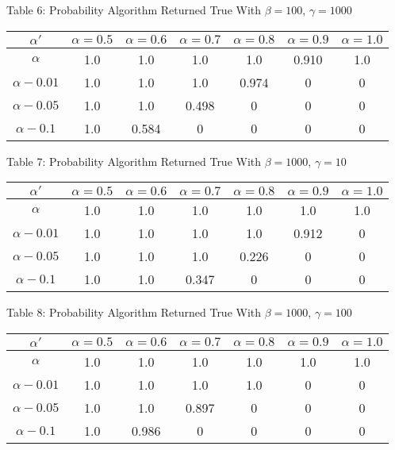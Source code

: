\documentclass{article}
\begin{document}
\begin{center}
Table 6: Probability Algorithm Returned True With $\beta=100$, $\gamma=1000$ \\
\begin{tabular}{|c|c|c|c|c|c|c|}
\hline
$\alpha'$ & $\alpha = 0.5$ & $\alpha = 0.6$ & $\alpha = 0.7$ & $\alpha = 0.8$ & $\alpha = 0.9$ & $\alpha = 1.0$ \\
\hline
$\alpha$ & 1.0 & 1.0 & 1.0 & 1.0 & 0.910 & 1.0 \\
\hline
$\alpha-0.01$ & 1.0 & 1.0 & 1.0 & 0.974 & 0 & 0 \\
\hline
$\alpha-0.05$ & 1.0 & 1.0 & 0.498 & 0 & 0 & 0 \\
\hline
$\alpha-0.1$ & 1.0 & 0.584 & 0 & 0 & 0 & 0 \\
\hline
\end{tabular}
\end{center}

\begin{center}
Table 7: Probability Algorithm Returned True With $\beta=1000$, $\gamma=10$ \\
\begin{tabular}{|c|c|c|c|c|c|c|}
\hline
$\alpha'$ & $\alpha = 0.5$ & $\alpha = 0.6$ & $\alpha = 0.7$ & $\alpha = 0.8$ & $\alpha = 0.9$ & $\alpha = 1.0$ \\
\hline
$\alpha$ & 1.0 & 1.0 & 1.0 & 1.0 & 1.0 & 1.0 \\
\hline
$\alpha-0.01$ & 1.0 & 1.0 & 1.0 & 1.0 & 0.912 & 0 \\
\hline
$\alpha-0.05$ & 1.0 & 1.0 & 1.0 & 0.226 & 0 & 0 \\
\hline
$\alpha-0.1$ & 1.0 & 1.0 & 0.347 & 0 & 0 & 0 \\
\hline
\end{tabular}
\end{center}

\begin{center}
Table 8: Probability Algorithm Returned True With $\beta=1000$, $\gamma=100$ \\
\begin{tabular}{|c|c|c|c|c|c|c|}
\hline
$\alpha'$ & $\alpha = 0.5$ & $\alpha = 0.6$ & $\alpha = 0.7$ & $\alpha = 0.8$ & $\alpha = 0.9$ & $\alpha = 1.0$ \\
\hline
$\alpha$ & 1.0 & 1.0 & 1.0 & 1.0 & 1.0 & 1.0 \\
\hline
$\alpha-0.01$ & 1.0 & 1.0 & 1.0 & 1.0 & 0 & 0 \\
\hline
$\alpha-0.05$ & 1.0 & 1.0 & 0.897 & 0 & 0 & 0 \\
\hline
$\alpha-0.1$ & 1.0 & 0.986 & 0 & 0 & 0 & 0 \\
\hline
\end{tabular}
\end{center}
\end{document}
